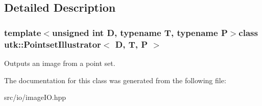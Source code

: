 \subsection{Detailed Description}
\subsubsection*{template$<$unsigned int D, typename T, typename P$>$class utk\-::\-Pointset\-Illustrator$<$ D, T, P $>$}

Outputs an image from a point set. 

The documentation for this class was generated from the following file\-:\begin{DoxyCompactItemize}
\item 
src/io/image\-I\-O.\-hpp\end{DoxyCompactItemize}
